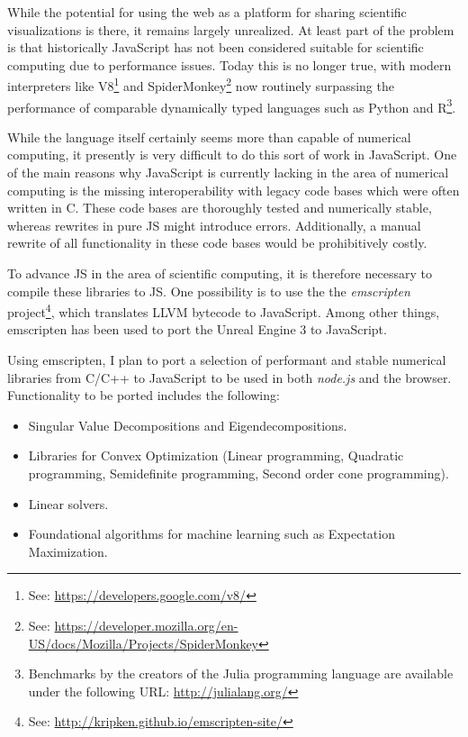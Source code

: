 \documentclass{scrartcl}
\begin{document}
While the potential for using the web as a platform for sharing scientific visualizations is there, it remains largely unrealized.  At least part of the problem is that historically JavaScript has not been considered suitable for scientific computing due to performance issues. Today this is no longer true, with modern interpreters like V8\footnote{See: \url{https://developers.google.com/v8/}}
and SpiderMonkey\footnote{See: \url{https://developer.mozilla.org/en-US/docs/Mozilla/Projects/SpiderMonkey}} now routinely surpassing the performance of comparable dynamically typed languages such as Python and R\footnote{Benchmarks by the creators of the Julia programming language are available under the following URL: \url{http://julialang.org/}}. 

While the language itself certainly seems more than capable of numerical computing, it presently is very difficult to do this sort of work in JavaScript. One of the main reasons why JavaScript is currently lacking in the area of numerical computing is the missing interoperability with legacy code bases which were often written in C. These code bases are thoroughly tested and numerically stable, whereas rewrites in pure JS might introduce errors. Additionally, a manual rewrite of all functionality in these code bases would be prohibitively costly.

To advance JS in the area of scientific computing, it is therefore necessary to compile these libraries to JS. One possibility is to use the the \emph{emscripten} project\footnote{See: \url{http://kripken.github.io/emscripten-site/}}, which translates LLVM bytecode to JavaScript. Among other things, emscripten has been used to port the Unreal Engine 3 to JavaScript.

Using emscripten, I plan to port a selection of performant and stable numerical libraries from C/C++ to JavaScript to be used in both \emph{node.js} and the browser. Functionality to be ported includes the following:
\begin{itemize}
\item Singular Value Decompositions and Eigendecompositions.
\item Libraries for Convex Optimization (Linear programming, Quadratic programming, Semidefinite programming, Second order cone programming).
\item Linear solvers.
\item Foundational algorithms for machine learning such as Expectation Maximization.
\end{itemize}
\end{document}
